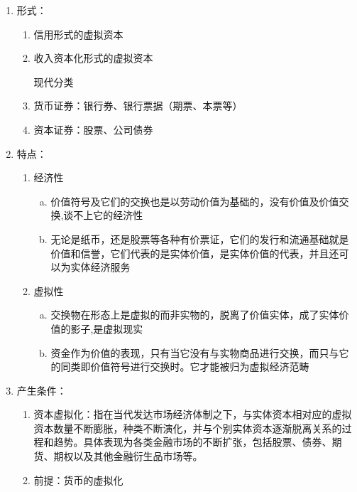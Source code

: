 \documentclass[12pt]{book}
\begin{document}
\begin{enumerate}[1.]
    \item 形式：
          \begin{enumerate}[(1)]
              \item 信用形式的虚拟资本
              \item 收入资本化形式的虚拟资本
                    \par * 现代分类
              \item 货币证券：银行券、银行票据（期票、本票等）
              \item 资本证券：股票、公司债券
          \end{enumerate}
    \item 特点：
          \begin{enumerate}[(1)]
              \item 经济性
                    \begin{enumerate}[a.]
                        \item 价值符号及它们的交换也是以劳动价值为基础的，没有价值及价值交换,谈不上它的经济性
                        \item 无论是纸币，还是股票等各种有价票证，它们的发行和流通基础就是价值和信誉，它们代表的是实体价值，是实体价值的代表，并且还可以为实体经济服务
                    \end{enumerate}
              \item 虚拟性
                    \begin{enumerate}[a.]
                        \item 交换物在形态上是虚拟的而非实物的，脱离了价值实体，成了实体价值的影子,是虚拟现实
                        \item 资金作为价值的表现，只有当它没有与实物商品进行交换，而只与它的同类即价值符号进行交换时。它才能被归为虚拟经济范畴
                    \end{enumerate}
          \end{enumerate}
    \item 产生条件：
          \begin{enumerate}[(1)]
              \item 资本虚拟化：指在当代发达市场经济体制之下，与实体资本相对应的虚拟资本数量不断膨胀，种类不断演化，并与个别实体资本逐渐脱离关系的过程和趋势。具体表现为各类金融市场的不断扩张，包括股票、债券、期货、期权以及其他金融衍生品市场等。
              \item 前提：货币的虚拟化
                    \begin{enumerate}[a.]

\end{enumerate}
\end{enumerate}
\end{enumerate}
\end{document}
